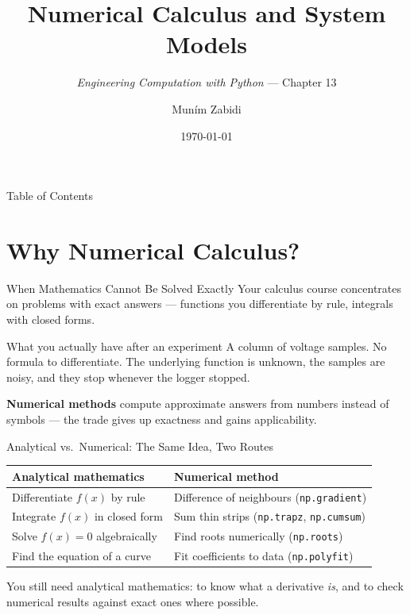 \documentclass[9pt,aspectratio=169,xcolor=table]{beamer}
\title{Numerical Calculus and System Models}
\subtitle{\emph{Engineering Computation with Python} --- Chapter 13}
\author{Mun\'{i}m Zabidi}
\institute{\color{primary}Faculty of Electrical Engineering, Universiti Teknologi Malaysia}
\date{\today}
\begin{document}
\titlepage

\begin{frame}{Table of Contents}
    \tableofcontents
\end{frame}

\section{Why Numerical Calculus?}

\begin{frame}{When Mathematics Cannot Be Solved Exactly}
    \leavevmode
    Your calculus course concentrates on problems with exact answers ---
    functions you differentiate by rule, integrals with closed forms.

    \vspace{2mm}
    \begin{alertblock}{What you actually have after an experiment}
        A column of voltage samples. No formula to differentiate. The
        underlying function is unknown, the samples are noisy, and they
        stop whenever the logger stopped.
    \end{alertblock}

    \vspace{2mm}
    \textbf{Numerical methods} compute approximate answers from numbers
    instead of symbols --- the trade gives up exactness and gains
    \alert{applicability}.
\end{frame}

\begin{frame}{Analytical vs.\ Numerical: The Same Idea, Two Routes}
    \leavevmode
    \small
    \begin{center}
    \begin{tabular}{@{}p{5.0cm}p{6.6cm}@{}}
        \toprule
        \textbf{Analytical mathematics} & \textbf{Numerical method} \\
        \midrule
        Differentiate $f(x)$ by rule & Difference of neighbours
            (\texttt{np.gradient}) \\
        Integrate $f(x)$ in closed form & Sum thin strips
            (\texttt{np.trapz}, \texttt{np.cumsum}) \\
        Solve $f(x)=0$ algebraically & Find roots numerically
            (\texttt{np.roots}) \\
        Find the equation of a curve & Fit coefficients to data
            (\texttt{np.polyfit}) \\
        \bottomrule
    \end{tabular}
    \end{center}

    \vspace{2mm}
    {\small You still need analytical mathematics: to know what a
    derivative \emph{is}, and to check numerical results against exact
    ones where possible.}
\end{frame}
\end{document}
